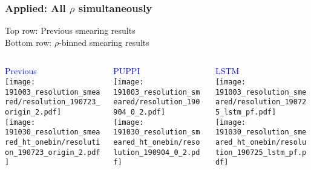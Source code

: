 \documentclass{beamer}
\begin{document}
\begin{frame}
  \frametitle{Applied: All $\rho$ simultaneously}

  Top row: Previous smearing results \\
  Bottom row: $\rho$-binned smearing results \\
  \vfill

  \begin{columns}
    \begin{column}{0.3\linewidth}
      \centering
      \textcolor{blue}{Previous} \\
      \texttt{[image: 191003\_resolution\_smeared/resolution\_190723\_origin\_2.pdf]} \\
      \texttt{[image: 191030\_resolution\_smeared\_ht\_onebin/resolution\_190723\_origin\_2.pdf]}
    \end{column}
    \begin{column}{0.3\linewidth}
      \centering
      \textcolor{blue}{PUPPI} \\
      \texttt{[image: 191003\_resolution\_smeared/resolution\_190904\_0\_2.pdf]} \\
      \texttt{[image: 191030\_resolution\_smeared\_ht\_onebin/resolution\_190904\_0\_2.pdf]}
    \end{column}
    \begin{column}{0.3\linewidth}
      \centering
      \textcolor{blue}{LSTM} \\
      \texttt{[image: 191003\_resolution\_smeared/resolution\_190725\_lstm\_pf.pdf]} \\
      \texttt{[image: 191030\_resolution\_smeared\_ht\_onebin/resolution\_190725\_lstm\_pf.pdf]}       
    \end{column}
  \end{columns}

\end{frame}
\end{document}
